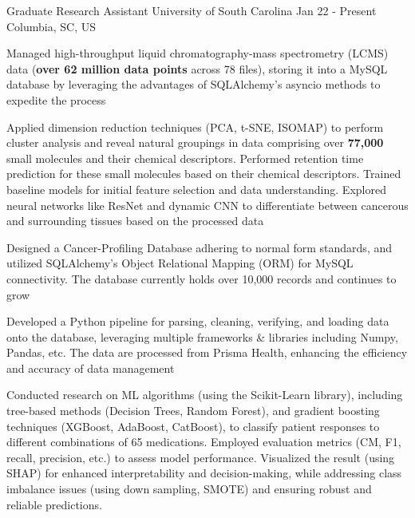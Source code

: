 

\begin{cventries}
    \cventry
        {Graduate Research Assistant} %
        {University of South Carolina} %
        {Jan 22 - Present}
        {Columbia, SC, US} %
        {
            \vspace*{0.2cm}
            \begin{cvitemsfree} %
                \item{Managed high-throughput liquid chromatography-mass spectrometry (LCMS) data (\textbf{over 62 million data points} across 78 files), storing it into a MySQL database by leveraging the advantages of SQLAlchemy's asyncio methods to expedite the process}
                \item{Applied dimension reduction techniques (PCA, t-SNE, ISOMAP) to perform cluster analysis and reveal natural groupings in data comprising over \textbf{77,000} small molecules and their chemical descriptors. Performed retention time prediction for these small molecules based on their chemical descriptors. Trained baseline models for initial feature selection and data understanding. Explored neural networks like ResNet and dynamic CNN to differentiate between cancerous and surrounding tissues based on the processed data}
                \item{Designed a Cancer-Profiling Database adhering to normal form standards, and utilized SQLAlchemy's Object Relational Mapping (ORM) for MySQL connectivity. The database currently holds over 10,000 records and continues to grow}
                \item{Developed a Python pipeline for parsing, cleaning, verifying, and loading data onto the database, leveraging multiple frameworks \& libraries including Numpy, Pandas, etc. The data are processed from Prisma Health, enhancing the efficiency and accuracy of data management}
                \item{Conducted research on ML algorithms (using the Scikit-Learn library), including tree-based methods (Decision Trees, Random Forest), and gradient boosting techniques (XGBoost, AdaBoost, CatBoost), to classify patient responses to different combinations of 65 medications. Employed evaluation metrics (CM, F1, recall, precision, etc.) to assess model performance. Visualized the result (using SHAP) for enhanced interpretability and decision-making, while addressing class imbalance issues (using down sampling, SMOTE) and ensuring robust and reliable predictions.}

\end{cvitemsfree}}
\end{cventries}
